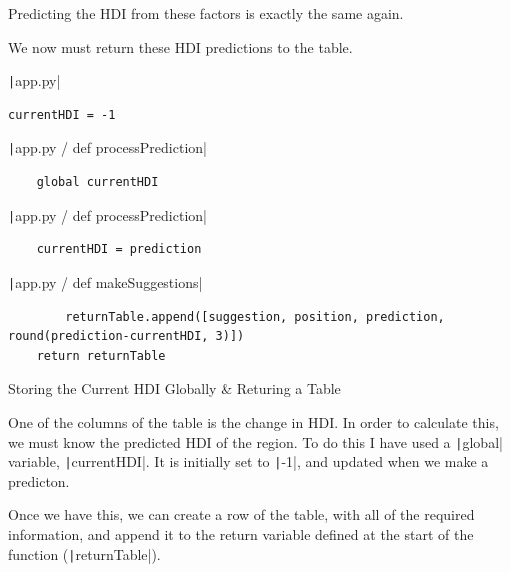 \documentclass[12pt]{report}
\newcommand{\pil}[1]{\protect\texttt|#1|}
\begin{document}
Predicting the HDI from these factors is exactly the same again.

\begin{center}
\end{center}

We now must return these HDI predictions to the table.

\begin{listing}[H]
\pil{app.py}
\begin{verbatim}
currentHDI = -1
\end{verbatim}
\pil{app.py / def processPrediction}
\begin{verbatim}
    global currentHDI
\end{verbatim}
\pil{app.py / def processPrediction}
\begin{verbatim}
    currentHDI = prediction
\end{verbatim}
\pil{app.py / def makeSuggestions}
\begin{verbatim}
        returnTable.append([suggestion, position, prediction, round(prediction-currentHDI, 3)])
    return returnTable
\end{verbatim}
\caption{Storing the Current HDI Globally \& Returing a Table}\label{cs:returnTable}
\end{listing}

One of the columns of the table is the change in HDI. In order to calculate this, we must know the predicted HDI of the region. To do this I have used a \pil{global} variable, \pil{currentHDI}. It is initially set to \pil{-1}, and updated when we make a predicton.

Once we have this, we can create a row of the table, with all of the required information, and append it to the return variable defined at the start of the function (\pil{returnTable}).
\end{document}

